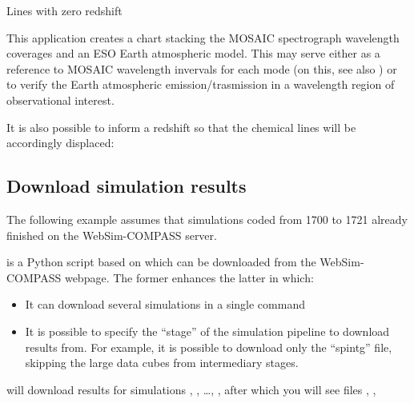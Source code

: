 \documentclass[letterpaper,10pt,english]{sphinxmanual}
\begin{document}

 \textendash{} Lines with zero redshift

This application creates a chart stacking the MOSAIC spectrograph wavelength coverages and
an ESO Earth atmospheric model. This may serve either as a reference to MOSAIC wavelength invervals for each
mode (on this, see also ) or to verify the Earth atmospheric emission/trasmission
in a wavelength region of observational interest.

It is also possible to inform a redshift so that the chemical lines will be accordingly displaced:


 \textendash{} 


\subsection{Download simulation results}
\label{\detokenize{aosss:download-simulation-results}}
The following example assumes that simulations coded from 1700 to 1721 already finished on the
WebSim-COMPASS server.

 is a Python script based on  which can be downloaded from the
WebSim-COMPASS webpage. The former enhances the latter in which:
\begin{itemize}
\item {} 
It can download several simulations in a single command

\item {} 
It is possible to specify the “stage” of the simulation pipeline to download results from. For example,
it is possible to download only the “spintg” file, skipping the large data cubes from intermediary stages.

\end{itemize}

\begin{sphinxVerbatim}[commandchars=\\\{\}]
   
\end{sphinxVerbatim}

will download results for simulations , , …,
 , after which you will see files
, , 
\end{document}

